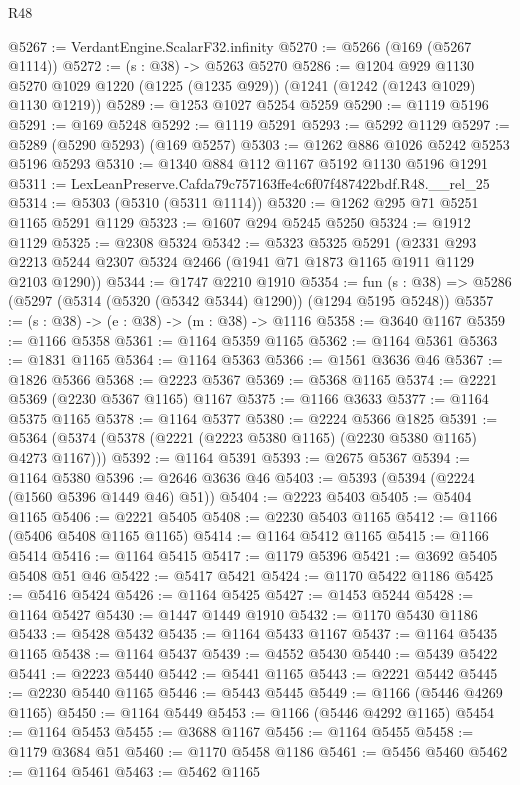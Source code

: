 \begin{lexlean}{R48}
\begin{coremodule}
@5267 := VerdantEngine.ScalarF32.infinity
@5270 := @5266 (@169 (@5267 @1114))
@5272 := (s : @38) -> @5263 @5270
@5286 := @1204
    @929
    @1130
    @5270
    @1029
    @1220
    (@1225 (@1235 @929))
    (@1241 (@1242 (@1243 @1029) @1130 @1219))
@5289 := @1253 @1027 @5254 @5259
@5290 := @1119 @5196
@5291 := @169 @5248
@5292 := @1119 @5291
@5293 := @5292 @1129
@5297 := @5289 (@5290 @5293) (@169 @5257)
@5303 := @1262 @886 @1026 @5242 @5253 @5196 @5293
@5310 := @1340 @884 @112 @1167 @5192 @1130 @5196 @1291
@5311 := LexLeanPreserve.Cafda79c757163ffe4c6f07f487422bdf.R48.__rel_25
@5314 := @5303 (@5310 (@5311 @1114))
@5320 := @1262 @295 @71 @5251 @1165 @5291 @1129
@5323 := @1607 @294 @5245 @5250
@5324 := @1912 @1129
@5325 := @2308 @5324
@5342 := @5323
    @5325
    @5291
    (@2331 @293 @2213 @5244 @2307 @5324 @2466 (@1941 @71 @1873 @1165 @1911 @1129 @2103 @1290))
@5344 := @1747 @2210 @1910
@5354 := fun (s : @38) => @5286 (@5297 (@5314 (@5320 (@5342 @5344) @1290)) (@1294 @5195 @5248))
@5357 := (s : @38) -> (e : @38) -> (m : @38) -> @1116
@5358 := @3640 @1167
@5359 := @1166 @5358
@5361 := @1164 @5359 @1165
@5362 := @1164 @5361
@5363 := @1831 @1165
@5364 := @1164 @5363
@5366 := @1561 @3636 @46
@5367 := @1826 @5366
@5368 := @2223 @5367
@5369 := @5368 @1165
@5374 := @2221 @5369 (@2230 @5367 @1165) @1167
@5375 := @1166 @3633
@5377 := @1164 @5375 @1165
@5378 := @1164 @5377
@5380 := @2224 @5366 @1825
@5391 := @5364 (@5374 (@5378 (@2221 (@2223 @5380 @1165) (@2230 @5380 @1165) @4273 @1167)))
@5392 := @1164 @5391
@5393 := @2675 @5367
@5394 := @1164 @5380
@5396 := @2646 @3636 @46
@5403 := @5393 (@5394 (@2224 (@1560 @5396 @1449 @46) @51))
@5404 := @2223 @5403
@5405 := @5404 @1165
@5406 := @2221 @5405
@5408 := @2230 @5403 @1165
@5412 := @1166 (@5406 @5408 @1165 @1165)
@5414 := @1164 @5412 @1165
@5415 := @1166 @5414
@5416 := @1164 @5415
@5417 := @1179 @5396
@5421 := @3692 @5405 @5408 @51 @46
@5422 := @5417 @5421
@5424 := @1170 @5422 @1186
@5425 := @5416 @5424
@5426 := @1164 @5425
@5427 := @1453 @5244
@5428 := @1164 @5427
@5430 := @1447 @1449 @1910
@5432 := @1170 @5430 @1186
@5433 := @5428 @5432
@5435 := @1164 @5433 @1167
@5437 := @1164 @5435 @1165
@5438 := @1164 @5437
@5439 := @4552 @5430
@5440 := @5439 @5422
@5441 := @2223 @5440
@5442 := @5441 @1165
@5443 := @2221 @5442
@5445 := @2230 @5440 @1165
@5446 := @5443 @5445
@5449 := @1166 (@5446 @4269 @1165)
@5450 := @1164 @5449
@5453 := @1166 (@5446 @4292 @1165)
@5454 := @1164 @5453
@5455 := @3688 @1167
@5456 := @1164 @5455
@5458 := @1179 @3684 @51
@5460 := @1170 @5458 @1186
@5461 := @5456 @5460
@5462 := @1164 @5461
@5463 := @5462 @1165

\end{coremodule}
\end{lexlean}

